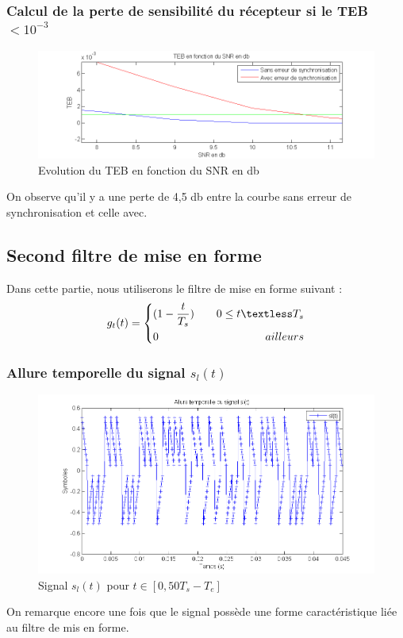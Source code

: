 \documentclass[11pt]{article}
\begin{document}
	
	\subsubsection{Calcul de la perte de sensibilité du récepteur si le TEB $< 10^{-3}$}
			\begin{figure}[!ht]
				\centering
				\includegraphics[scale=0.5]{images/Q317.png}
				\caption{Evolution du TEB en fonction du SNR en db}
				\label{Q315-6-2}
			\end{figure}
			On observe qu'il y a une perte de 4,5 db entre la courbe sans erreur de synchronisation et celle avec.
			
	\subsection{Second filtre de mise en forme}
		Dans cette partie, nous utiliserons le filtre de mise en forme suivant :
		\begin{equation}
			g_t(t) = 
			\left\{
		    	\begin{aligned}
		    		&(1-\frac{t}{T_s}) & \,\,\,\,\,\, 0 \le t \textless T_s\\
		    		&0 & \,\,\,\,\,\, ailleurs
		      	\end{aligned}
		    \right.
		\end{equation}
		
\newpage
		\subsubsection{Allure temporelle du signal $s_l(t)$}
			\begin{figure}[h]
				\centering
				\includegraphics[scale=0.5]{images/Q318-1.png}
				\caption{Signal $s_l(t)$ pour $t \in [0, 50T_s-T_e]$}
				\label{Q318-1}
			\end{figure}
			On remarque encore une fois que le signal possède une forme caractéristique liée au filtre de mis en forme.
			
\end{document}
